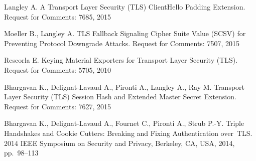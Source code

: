 \begin{thebibliography}{999}
Langley A.
A Transport Layer Security (TLS) ClientHello Padding Extension.
Request for Comments: 7685, 2015

Moeller B., Langley A.
TLS Fallback Signaling Cipher Suite Value (SCSV) for Preventing Protocol 
Downgrade Attacks.
Request for Comments: 7507, 2015

Rescorla E.
Keying Material Exporters for Transport Layer Security (TLS).
Request for Comments: 5705, 2010

Bhargavan K., Delignat-Lavaud A., Pironti A., Langley A., Ray M.
Transport Layer Security (TLS) Session Hash and Extended Master Secret 
Extension.
Request for Comments: 7627, 2015

Bhargavan K., Delignat-Lavaud A., Fournet C., Pironti A., Strub P.-Y. 
Triple Handshakes and Cookie Cutters: Breaking and Fixing Authentication 
over~TLS. 
2014 IEEE Symposium on Security and Privacy, Berkeley, CA, USA, 2014, 
pp.~98--113
\label{LastBib}
\end{thebibliography}

